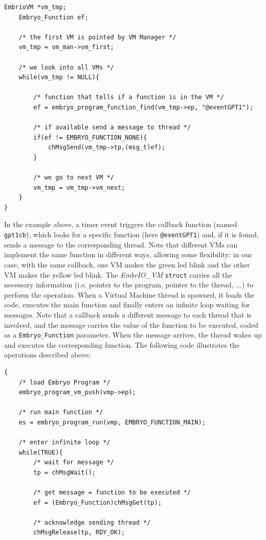 \documentclass[a4paper,10pt]{article}
\begin{document}
\begin{multicols}{2}
\begin{lstlisting}[caption={Callback looking for a function in VMs}]
	EmbrioVM *vm_tmp;
	Embryo_Function ef;
	
	/* the first VM is pointed by VM Manager */
	vm_tmp = vm_man->vm_first;
	
	/* we look into all VMs */
	while(vm_tmp != NULL){
		
		/* function that tells if a function is in the VM */
		ef = embryo_program_function_find(vm_tmp->ep, "@eventGPT1");
		
		/* if available send a message to thread */
		if(ef != EMBRYO_FUNCTION_NONE){
			chMsgSend(vm_tmp->tp,(msg_t)ef);
		}
		
		/* we go to next VM */
		vm_tmp = vm_tmp->vm_next;
	}
}
\end{lstlisting}
\medskip
In the example above, a timer event triggers the callback function (named \texttt{gpt1cb}), which looks for a specific function (here \texttt{@eventGPT1}) and, if it is found, sends a message to the corresponding thread. Note that different VMs can implement the same function in different ways, allowing some flexibility: in our case, with the same callback, one VM makes the green led blink and the other VM makes the yellow led blink.\newline
The \textit{EmbrIO\_VM} \texttt{struct} carries all the necessary information (i.e. pointer to the program, pointer to the thread, ...) to perform the operation.\newline
When a Virtual Machine thread is spawned, it loads the code, executes the main function and finally enters an infinite loop waiting for messages. Note that a callback sends a different message to each thread that is involved, and the message carries the value of the function to be executed, coded as a \texttt{Embryo\_Function} parameter. When the message arrives, the thread wakes up and executes the corresponding function. The following code illustrates the operations described above:
\medskip
\lstset{language=C}
\begin{lstlisting}[caption={Callback looking for a function in VMs}]
{
	/* load Embryo Program */
	embryo_program_vm_push(vmp->ep);
	
	/* run main function */
	es = embryo_program_run(vmp, EMBRYO_FUNCTION_MAIN);
	
	/* enter infinite loop */
	while(TRUE){
		/* wait for message */
		tp = chMsgWait();
		
		/* get message = function to be executed */
		ef = (Embryo_Function)chMsgGet(tp);
		
		/* acknowledge sending thread */
		chMsgRelease(tp, RDY_OK);
		

\end{lstlisting}
\end{multicols}
\end{document}
